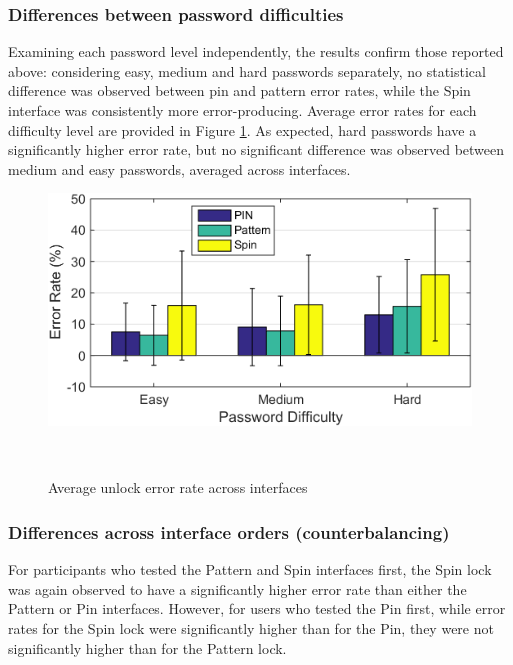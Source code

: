 \documentclass{sigchi}
\begin{document}
\subsubsection{Differences between password difficulties} 
Examining each password level independently, the results confirm those reported above: considering easy, medium and hard passwords separately, no statistical difference was observed between pin and pattern error rates, while the Spin interface was consistently more error-producing. Average error rates for each difficulty level are provided in Figure \ref{fig:unlock_error_rate_difficulty_bar}. As expected, hard passwords have a significantly higher error rate, but no significant difference was observed between medium and easy passwords, averaged across interfaces. 
 \begin{figure}[h]
   \centering
   \includegraphics[width=0.9\columnwidth]{figures/analysis_3_error_bar.png}
   \caption{Average unlock error rate across interfaces}~\label{fig:unlock_error_rate_difficulty_bar}
 \end{figure}

\subsubsection{Differences across interface orders (counterbalancing)}
For participants who tested the Pattern and Spin interfaces first, the Spin lock was again observed to have a significantly higher error rate than either the Pattern or Pin interfaces. However, for users who tested the Pin first, while error rates for the Spin lock were significantly higher than for the Pin, they were not significantly higher than for the Pattern lock. 
\end{document}
